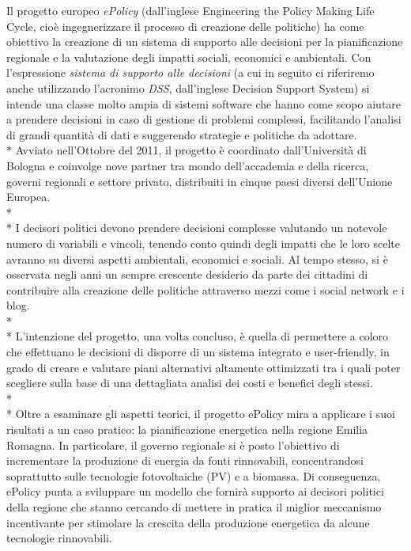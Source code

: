 \documentclass[12pt,a4paper,openright,twoside]{report}
\begin{document}
Il progetto europeo \emph{ePolicy} (dall'inglese Engineering the Policy Making Life Cycle, cioè ingegnerizzare il processo di creazione delle politiche) ha come obiettivo la creazione di un sistema di supporto alle decisioni per la pianificazione regionale e la valutazione degli impatti sociali, economici e ambientali. Con l'espressione \emph{sistema di supporto alle decisioni} (a cui in seguito ci riferiremo anche utilizzando l'acronimo \emph{DSS}, dall'inglese Decision Support System) si intende una classe molto ampia di sistemi software che hanno come scopo aiutare a prendere decisioni in caso di gestione di problemi complessi, facilitando l'analisi di grandi quantità di dati e suggerendo strategie e  politiche da adottare.\\*
Avviato nell'Ottobre del 2011, il progetto è coordinato dall'Università di Bologna e coinvolge nove partner tra mondo dell'accademia e della ricerca, governi regionali e settore privato, distribuiti in cinque paesi diversi dell'Unione Europea.\\*\\*
I decisori politici devono prendere decisioni complesse valutando un notevole numero di variabili e vincoli, tenendo conto quindi degli impatti che le loro scelte avranno su diversi aspetti ambientali, economici e sociali. Al tempo stesso, si è osservata negli anni un sempre crescente desiderio da parte dei cittadini di contribuire alla creazione delle politiche attraverso mezzi come i social network e i blog.\\*\\*
L'intenzione del progetto, una volta concluso, è quella di permettere a coloro che effettuano le decisioni di disporre di un sistema integrato e user-friendly, in grado di creare e valutare piani alternativi altamente ottimizzati tra i quali poter scegliere sulla base di una dettagliata analisi dei costi e benefici degli stessi.\\*\\*
Oltre a esaminare gli aspetti teorici, il progetto ePolicy mira a applicare i suoi risultati a un caso pratico: la pianificazione energetica nella regione Emilia Romagna. In particolare, il governo regionale si è posto l'obiettivo di incrementare la produzione di energia da fonti rinnovabili, concentrandosi soprattutto sulle tecnologie fotovoltaiche (PV) e a biomassa. Di conseguenza, ePolicy punta a sviluppare un modello che fornirà supporto ai decisori politici della regione che stanno cercando di mettere in pratica il miglior meccanismo incentivante per stimolare la crescita della produzione energetica da alcune tecnologie rinnovabili.
\end{document}
